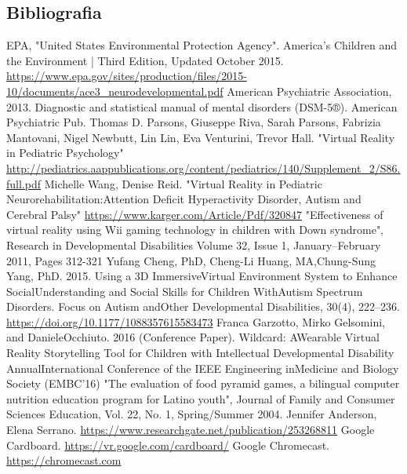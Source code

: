 \subsection{Bibliografia} \label{subsec:biblio}
\renewcommand\refname{}
\begin{thebibliography}{100}
 EPA, "United States Environmental Protection Agency". America's Children and the Environment | Third Edition, Updated October 2015. 
\url{https://www.epa.gov/sites/production/files/2015-10/documents/ace3_neurodevelopmental.pdf}
 American Psychiatric Association, 2013. Diagnostic and statistical manual of mental disorders (DSM-5®). American Psychiatric Pub. 
 Thomas D. Parsons, Giuseppe Riva, Sarah Parsons, Fabrizia Mantovani, Nigel Newbutt, Lin Lin, Eva Venturini, Trevor Hall. "Virtual Reality in Pediatric Psychology"
\url{http://pediatrics.aappublications.org/content/pediatrics/140/Supplement_2/S86.full.pdf}
 Michelle Wang, Denise Reid. "Virtual Reality in Pediatric Neurorehabilitation:Attention Deficit Hyperactivity Disorder, Autism and Cerebral Palsy"
\url{https://www.karger.com/Article/Pdf/320847} 
 "Effectiveness of virtual reality using Wii gaming technology in children with Down syndrome", Research in Developmental Disabilities Volume 32, Issue 1, January–February 2011, Pages 312-321
 Yufang Cheng, PhD, Cheng-Li Huang, MA,Chung-Sung Yang, PhD. 2015. Using a 3D ImmersiveVirtual Environment System to Enhance SocialUnderstanding and Social Skills for Children WithAutism Spectrum Disorders. Focus on Autism andOther Developmental Disabilities, 30(4), 222–236.
\url{https://doi.org/10.1177/1088357615583473}
Franca Garzotto, Mirko Gelsomini, and DanieleOcchiuto. 2016 (Conference Paper). Wildcard: AWearable Virtual Reality Storytelling Tool for Children with Intellectual Developmental Disability AnnualInternational Conference of the IEEE Engineering inMedicine and Biology Society (EMBC’16)
"The evaluation of food pyramid games, a bilingual computer nutrition education program
for Latino youth", Journal of Family and Consumer Sciences Education, Vol. 22, No. 1, Spring/Summer 2004. Jennifer Anderson, Elena Serrano.
\url{https://www.researchgate.net/publication/253268811}
 Google Cardboard. 
\url{https://vr.google.com/cardboard/}
 Google Chromecast.
\url{https://chromecast.com}

\end{thebibliography}